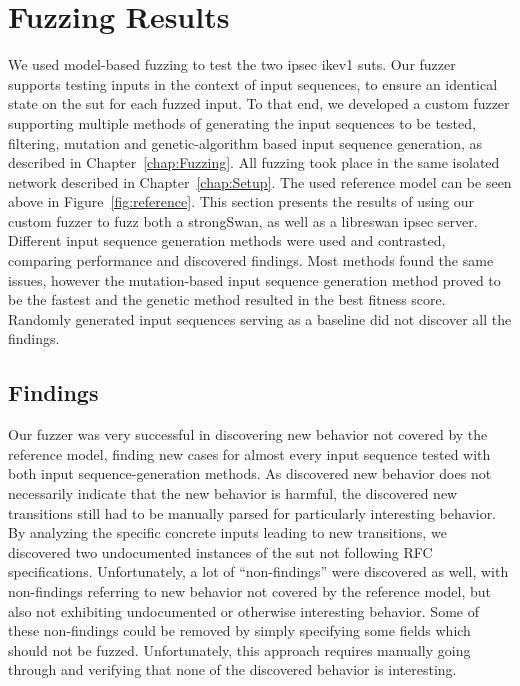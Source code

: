 \section{Fuzzing Results} \label{sec:fuzzresults}
We used model-based fuzzing to test the two \ac{ipsec} \ac{ike}v1 \acp{sut}. Our fuzzer supports testing inputs in the context of input sequences, to ensure an identical state on the \ac{sut} for each fuzzed input. To that end, we developed a custom fuzzer supporting multiple methods of generating the input sequences to be tested, filtering, mutation and genetic-algorithm based input sequence generation, as described in Chapter~\ref{chap:Fuzzing}. All fuzzing took place in the same isolated network described in Chapter~\ref{chap:Setup}. The used reference model can be seen above in Figure~\ref{fig:reference}. This section presents the results of using our custom fuzzer to fuzz both a strongSwan, as well as a libreswan \ac{ipsec} server. Different input sequence generation methods were used and contrasted, comparing performance and discovered findings. Most methods found the same issues, however the mutation-based input sequence generation method proved to be the fastest and the genetic method resulted in the best fitness score. Randomly generated input sequences serving as a baseline did not discover all the findings. 

\subsection{Findings} \label{subsec:findings}
Our fuzzer was very successful in discovering new behavior not covered by the reference model, finding new cases for almost every input sequence tested with both input sequence-generation methods. As discovered new behavior does not necessarily indicate that the new behavior is harmful, the discovered new transitions still had to be manually parsed for particularly interesting behavior. By analyzing the specific concrete inputs leading to new transitions, we discovered two undocumented instances of the \ac{sut} not following RFC specifications. Unfortunately, a lot of ``non-findings'' were discovered as well, with non-findings referring to new behavior not covered by the reference model, but also not exhibiting undocumented or otherwise interesting behavior. Some of these non-findings could be removed by simply specifying some fields which should not be fuzzed. Unfortunately, this approach requires manually going through and verifying that none of the discovered behavior is interesting. 


